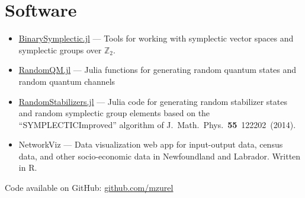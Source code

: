 \documentclass[letterpaper,11pt]{article}
\begin{document}
\section*{Software}
\begin{itemize}[leftmargin=*]
	\item \href{https://github.com/mzurel/BinarySymplectic.jl}{BinarySymplectic.jl} --- Tools for working with symplectic vector spaces and symplectic groups over $\mathbb{Z}_2$.
	\vspace{-4pt}
	\item \href{https://github.com/mzurel/RandomQM.jl}{RandomQM.jl} --- Julia functions for generating random quantum states and random quantum channels
	\vspace{-4pt}
	\item \href{https://github.com/mzurel/RandomStabilizers.jl}{RandomStabilizers.jl} --- Julia code for generating random stabilizer states and random symplectic group elements based on the ``SYMPLECTICImproved'' algorithm of J.~Math.~Phys.~\textbf{55}~122202~(2014).
	\vspace{-4pt}
	\item NetworkViz --- Data visualization web app for input-output data, census data, and other socio-economic data in Newfoundland and Labrador.  Written in R.
	\vspace{-4pt}
\end{itemize}
Code available on GitHub: \href{https://github.com/mzurel}{github.com/mzurel}

\end{document}
